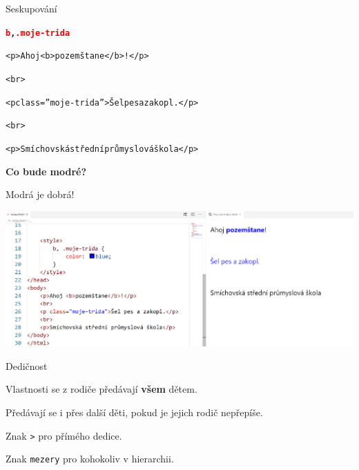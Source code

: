 \documentclass[aspectratio=1610]{beamer}
\begin{document}
\begin{frame}{Seskupování}
    \begin{cardTiny}
        \begin{flushleft}
            \begin{alltt}
                \textbf{\textcolor{red}{b}, \textcolor{red}{.moje-trida}} \string{\\
                    \textcolor{blue}{color}: \textcolor{orange}{blue};\\
                \string}
            \end{alltt}
            \begin{alltt}
                <p>Ahoj <b>pozemštane</b>!</p>

                <br>
                
                <p class=''moje-trida''>Šel pes a zakopl.</p>
                
                <br>
                
                <p>Smíchovská střední průmyslová škola</p>
            \end{alltt}
        \end{flushleft}
    \end{cardTiny}
    \begin{cardTiny}
        \begin{center}
            \textbf{Co bude modré?}
        \end{center}
    \end{cardTiny}
\end{frame}

\begin{frame}{Modrá je dobrá!}
    \begin{center}
        \includegraphics[width=\textwidth]{img/html-7-8-2.png}
    \end{center}
\end{frame}

\begin{frame}{Dedičnost}
    \begin{cardTiny}
        Vlastnosti se z rodiče předávají \textbf{všem} dětem.

        Předávají se i přes další děti, pokud je jejich rodič nepřepíše.

        \vspace{2ex}

        Znak \texttt{>} pro přímého dedice.

        Znak \texttt{mezery} pro kohokoliv v hierarchii.
    \end{cardTiny}
\end{frame}
\end{document}
